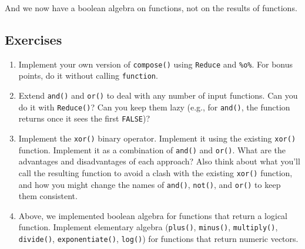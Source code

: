 And we now have a boolean algebra on functions, not on the results of
functions. 

\subsection{Exercises}

\begin{enumerate}
\def\labelenumi{\arabic{enumi}.}
\item
  Implement your own version of \texttt{compose()} using \texttt{Reduce}
  and \texttt{\%o\%}. For bonus points, do it without calling
  \texttt{function}.
\item
  Extend \texttt{and()} and \texttt{or()} to deal with any number of
  input functions. Can you do it with \texttt{Reduce()}? Can you keep
  them lazy (e.g., for \texttt{and()}, the function returns once it sees
  the first \texttt{FALSE})?
\item
  Implement the \texttt{xor()} binary operator. Implement it using the
  existing \texttt{xor()} function. Implement it as a combination of
  \texttt{and()} and \texttt{or()}. What are the advantages and
  disadvantages of each approach? Also think about what you'll call the
  resulting function to avoid a clash with the existing \texttt{xor()}
  function, and how you might change the names of \texttt{and()},
  \texttt{not()}, and \texttt{or()} to keep them consistent.
\item
  Above, we implemented boolean algebra for functions that return a
  logical function. Implement elementary algebra (\texttt{plus()},
  \texttt{minus()}, \texttt{multiply()}, \texttt{divide()},
  \texttt{exponentiate()}, \texttt{log()}) for functions that return
  numeric vectors.
\end{enumerate}
